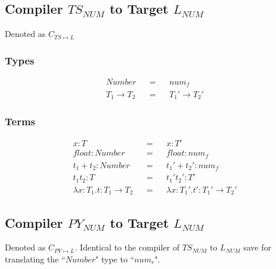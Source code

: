 \documentclass{article}
\begin{document}
	\subsection{Compiler $TS_{NUM}$ to Target $L_{NUM}$}
	Denoted as $C_{TS \mapsto L}$
	\subsubsection{Types}
	\begin{align*}
		Number					&& = && num_f\\
		T_1 \rightarrow T_2 	&& = && T_1' \rightarrow T_2'
	\end{align*}
	
	\subsubsection{Terms}
	\begin{align*}
	x: T										&& = && x: T'\\
	float: Number							 	&& = && float: num_f\\
	t_1 + t_2: Number					 		&& = && t_1' + t_2': num_f\\
	t_1 t_2: T						 			&& = && t_1' t_2': T'\\
	\lambda x\colon T_1.t: T_1 \rightarrow T_2	&& = && \lambda x: T_1'.t': T_1' \rightarrow T_2'
	\end{align*}
	
	
	\subsection{Compiler $PY_{NUM}$ to Target $L_{NUM}$}
		Denoted as $C_{PY \mapsto L}$. Identical to the compiler of $TS_{NUM}$ to $L_{NUM}$ save for translating the ``$Number$" type to ``$num_r$".

\end{document}
